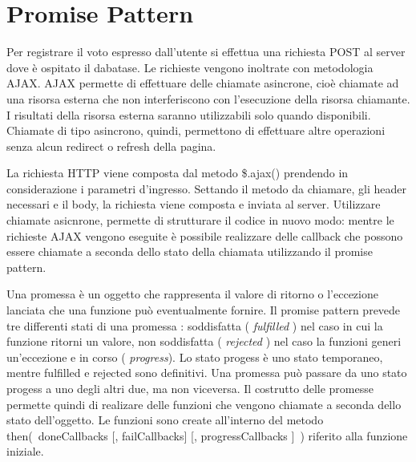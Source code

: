 \newpage
\section{Promise Pattern}
Per registrare il voto espresso dall'utente si effettua una richiesta POST al
server dove è ospitato il dabatase. Le richieste vengono inoltrate con
metodologia \ac{AJAX}. \ac{AJAX} permette di
effettuare delle chiamate asincrone, cioè chiamate ad una risorsa
esterna che non interferiscono con l'esecuzione della risorsa chiamante. I
risultati della risorsa esterna saranno utilizzabili solo quando disponibili.
Chiamate di tipo asincrono, quindi, permettono di effettuare altre operazioni
senza alcun redirect o refresh della pagina.

La richiesta HTTP viene composta dal metodo \$.ajax() prendendo in
considerazione i parametri d'ingresso. Settando il metodo da chiamare, gli
header necessari e il body, la richiesta viene composta e inviata al server.
Utilizzare chiamate asicnrone, permette di strutturare il codice in nuovo modo:
mentre le richieste \ac{AJAX} vengono eseguite è possibile realizzare delle
callback che possono essere chiamate a seconda dello stato della chiamata
utilizzando il promise pattern. 

Una promessa è un oggetto che rappresenta il valore di ritorno o l'eccezione
lanciata che una funzione può eventualmente fornire. Il promise pattern prevede
tre differenti stati di una promessa :
soddisfatta ( \emph{fulfilled} ) nel caso in cui la funzione ritorni un valore,
non soddisfatta ( \emph{rejected} ) nel caso la funzioni generi un'eccezione e in
corso ( \emph{progress}).
Lo stato progess è uno stato temporaneo, mentre fulfilled e rejected sono
definitivi. Una promessa può passare da uno stato progess a uno degli
altri due, ma non viceversa. Il costrutto delle promesse permette quindi di
realizare delle funzioni che vengono chiamate a seconda dello stato
dell'oggetto. Le funzioni sono create all'interno del metodo
then(~doneCallbacks [, failCallbacks] [, progressCallbacks ]~) riferito alla
funzione iniziale.

